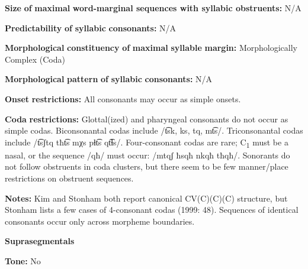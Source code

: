 \documentclass[output=paper]{langsci/langscibook}
\begin{document}
\begin{styleBody}
\textbf{Size} \textbf{of} \textbf{maximal} \textbf{word{}-marginal sequences with syllabic obstruents:} N/A
\end{styleBody}

\begin{styleBody}
\textbf{Predictability} \textbf{of} \textbf{syllabic} \textbf{consonants:} N/A
\end{styleBody}

\begin{styleBody}
\textbf{Morphological} \textbf{constituency} \textbf{of} \textbf{maximal} \textbf{syllable} \textbf{margin:} Morphologically Complex (Coda)
\end{styleBody}

\begin{styleBody}
\textbf{Morphological} \textbf{pattern} \textbf{of} \textbf{syllabic} \textbf{consonants:} N/A
\end{styleBody}

\begin{styleBody}
\textbf{Onset} \textbf{restrictions:} All consonants may occur as simple onsets.
\end{styleBody}

\begin{styleBody}
\textbf{Coda} \textbf{restrictions:} Glottal(ized) and pharyngeal consonants do not occur as simple codas. Biconsonantal codas include /t͡sk, ks, tq, mt͡s/. Triconsonantal codas include /t͡sʃtq tħt͡s mχs pɬt͡s qt͡ɬs/. Four-consonant codas are rare; C\textsubscript{1} must be a nasal, or the sequence /qħ/ must occur: /mtqʃ ħsqħ nkqħ tħqħ/. Sonorants do not follow obstruents in coda clusters, but there seem to be few manner/place restrictions on obstruent sequences.
\end{styleBody}

\begin{styleBody}
\textbf{Notes:} Kim and Stonham both report canonical CV(C)(C)(C) structure, but Stonham lists a few cases of 4-consonant codas (1999: 48). Sequences of identical consonants occur only across morpheme boundaries.
\end{styleBody}

\begin{styleBody}
\textbf{Suprasegmentals}
\end{styleBody}

\begin{styleBody}
\textbf{Tone:} No
\end{styleBody}
\end{document}
